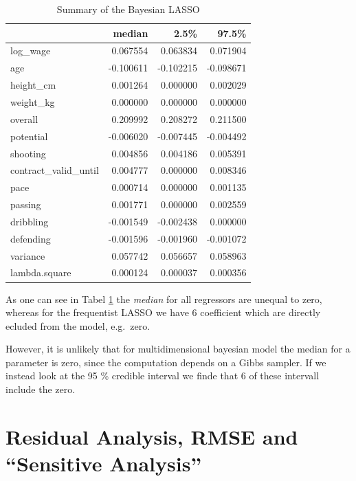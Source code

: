 \documentclass[12pt,a4paper]{article}
\begin{document}
\FloatBarrier

\begin{table}

\caption{\label{tab:unnamed-chunk-5}\label{tab:sum_bay} Summary of the Bayesian LASSO }
\centering
\begin{tabular}[t]{lrrr}
\toprule
  & median & 2.5\% & 97.5\%\\
\midrule
\rowcolor{gray!6}  log\_wage & 0.067554 & 0.063834 & 0.071904\\
age & -0.100611 & -0.102215 & -0.098671\\
\rowcolor{gray!6}  height\_cm & 0.001264 & 0.000000 & 0.002029\\
weight\_kg & 0.000000 & 0.000000 & 0.000000\\
\rowcolor{gray!6}  overall & 0.209992 & 0.208272 & 0.211500\\
potential & -0.006020 & -0.007445 & -0.004492\\
\rowcolor{gray!6}  shooting & 0.004856 & 0.004186 & 0.005391\\
contract\_valid\_until & 0.004777 & 0.000000 & 0.008346\\
\rowcolor{gray!6}  pace & 0.000714 & 0.000000 & 0.001135\\
passing & 0.001771 & 0.000000 & 0.002559\\
\rowcolor{gray!6}  dribbling & -0.001549 & -0.002438 & 0.000000\\
defending & -0.001596 & -0.001960 & -0.001072\\
\rowcolor{gray!6}  variance & 0.057742 & 0.056657 & 0.058963\\
lambda.square & 0.000124 & 0.000037 & 0.000356\\
\bottomrule
\end{tabular}
\end{table}

\FloatBarrier

As one can see in Tabel \ref{tab:sum_bay} the \emph{median} for all
regressors are unequal to zero, whereas for the frequentist \ac{LASSO}
we have 6 coefficient which are directly ecluded from the model,
e.g.~zero.

However, it is unlikely that for multidimensional bayesian model the
median for a parameter is zero, since the computation depends on a Gibbs
sampler. If we instead look at the 95 \% credible interval we finde that
6 of these intervall include the zero.

\newpage

\hypertarget{residual-analysis-and-sensitive-analysis}{%
\section{\texorpdfstring{Residual Analysis, \acf{RMSE} and
\enquote{Sensitive
Analysis}}{Residual Analysis,  and `Sensitive Analysis'}}\label{residual-analysis-and-sensitive-analysis}}
\end{document}
